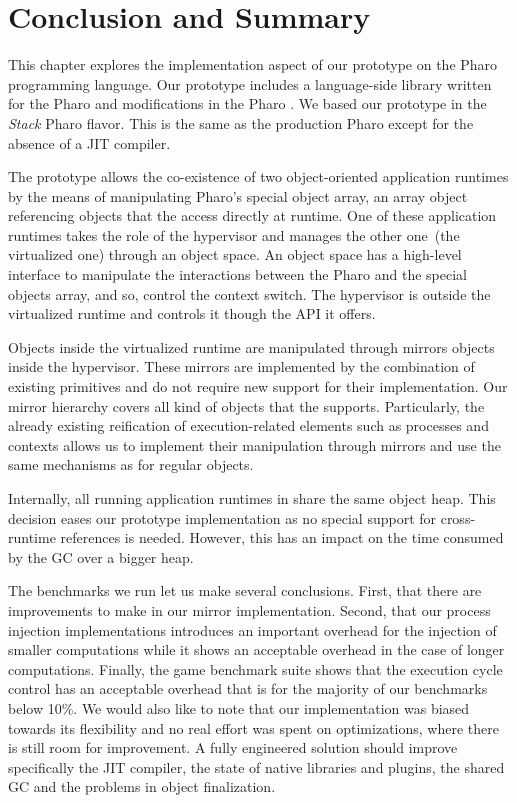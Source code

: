 \section{Conclusion and Summary}

This chapter explores the implementation aspect of our \Vtt prototype on the Pharo programming language. Our prototype includes a language-side library written for the Pharo and modifications in the Pharo \VM. We based our prototype in the \emph{Stack} Pharo \VM flavor. This \VM is the same as the production Pharo \VM except for the absence of a JIT compiler.

The \Vtt prototype allows the co-existence of two object-oriented application runtimes by the means of manipulating Pharo's special object array, an array object referencing objects that the \VM access directly at runtime. One of these application runtimes takes the role of the hypervisor and manages the other one~(the virtualized one) through an object space. An object space has a high-level interface to manipulate the interactions between the Pharo \VM and the special objects array, and so, control the context switch. The hypervisor is outside the virtualized runtime and controls it though the API it offers.

Objects inside the virtualized runtime are manipulated through mirrors objects inside the hypervisor. These mirrors are implemented by the combination of existing \VM primitives and do not require new \VM support for their implementation. Our mirror hierarchy covers all kind of objects that the \VM supports. Particularly, the already existing reification of execution-related elements such as processes and contexts allows us to implement their manipulation through mirrors and use the same mechanisms as for regular objects.

Internally, all running application runtimes in \Vtt share the same object heap. This decision eases our prototype implementation as no special support for cross-runtime references is needed. However, this has an impact on the time consumed by the GC over a bigger heap.

The benchmarks we run let us make several conclusions. First, that there are improvements to make in our mirror implementation. Second, that our process injection implementations introduces an important overhead for the injection of smaller computations while it shows an acceptable overhead in the case of longer computations. Finally, the game benchmark suite shows that the execution cycle control has an acceptable overhead that is for the majority of our benchmarks below 10\%. We would also like to note that our implementation was biased towards its flexibility and no real effort was spent on optimizations, where there is still room for improvement. A fully engineered solution should improve specifically the JIT compiler, the state of native libraries and plugins, the shared GC and the problems in object finalization.

